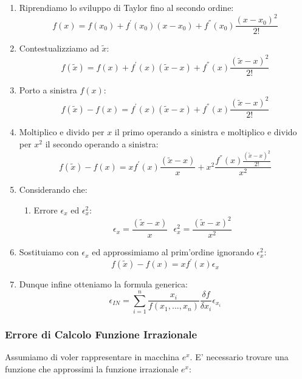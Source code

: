 \documentclass{article}
\begin{document}
\begin{enumerate}
    \item Riprendiamo lo sviluppo di Taylor fino al secondo ordine:
    \[ f(x) = f(x_0) + f^{'}(x_0)(x-x_0) + f^{''}(x_0)\frac{(x-x_0)^{2}}{2!}\]
    \vspace*{8px}
    \item Contestualizziamo ad $\tilde{x}$:
    \[ f(\tilde{x}) = f(x) + f^{'}(x)(\tilde{x}-x) + f^{''}(x)\frac{(\tilde{x}-x)^{2}}{2!}\]
    \vspace*{8px}
    \item Porto a sinistra $f(x)$:
    \[ f(\tilde{x}) -f(x) = f^{'}(x)(\tilde{x}-x) + f^{''}(x)\frac{(\tilde{x}-x)^{2}}{2!}\]
    \newpage
    \item Moltiplico e divido per $x$ il primo operando a sinistra e moltiplico e divido per $x^{2}$ il secondo operando a sinistra:
    \[ f(\tilde{x}) -f(x) = xf^{'}(x)\frac{(\tilde{x}-x)}{x} + x^{2}\frac{f^{''}(x)\frac{(\tilde{x}-x)^{2}}{2!}}{x^{2}}\]
    \item Considerando che:
    \begin{enumerate}
        \item Errore $\epsilon_{x}$ ed $\epsilon^{2}_{x}$:
        \vspace*{5px}
        \[ \boxed{\epsilon_{x} = \frac{(\tilde{x}-x)}{x}} \:\:\: \boxed{\epsilon^{2}_{x} = \frac{(\tilde{x}-x)^{2}}{x^2}} \]
    \end{enumerate}
    \vspace*{8px}
    \item Sostituiamo con $\epsilon_{x}$ ed approssimiamo al prim'ordine ignorando $\epsilon^{2}_{x}$:
    \[ f(\tilde{x}) - f(x) = xf^{'}(x)\epsilon_{x} \]
    \vspace*{8px}
    \item Dunque infine otteniamo la formula generica:
    \[ \boxed{\epsilon_{IN} = \sum_{i=1}^{n} \frac{x_{i}}{f(x_{1},...,x_{n})} \frac{\delta f}{\delta x_{i}} \epsilon_{x_{i}}} \]
\end{enumerate}

\vspace*{15px}

\subsubsection{Errore di Calcolo Funzione Irrazionale}

Assumiamo di voler rappresentare in macchina $e^x$. E' necessario trovare una funzione che approssimi la funzione irrazionale $e^x$:
\end{document}
